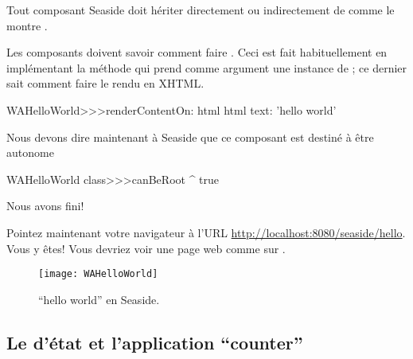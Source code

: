 \documentclass[a4paper,10pt,twoside]{book}
\begin{document}
Tout composant Seaside doit hériter directement ou indirectement de
 comme le montre .


Les composants doivent savoir comment faire .
Ceci est fait habituellement en implémentant la méthode
 qui prend comme argument une
instance de  ; ce dernier sait comment faire le
rendu en XHTML.

\begin{code}{}
WAHelloWorld>>>renderContentOn: html
	html text: 'hello world'
\end{code}

\noindent
Nous devons dire maintenant à Seaside que ce composant est destiné à
être autonome


\begin{code}{}
WAHelloWorld class>>>canBeRoot
	^ true
\end{code}

\noindent
Nous avons fini!

Pointez maintenant votre navigateur 
à l'URL \url{http://localhost:8080/seaside/hello}.
Vous y êtes! Vous devriez voir une page web comme sur
 .

\begin{figure}[htb]
\begin{center}
\texttt{[image: WAHelloWorld]}
\caption{``hello world'' en Seaside.}
\end{center}
\end{figure}

\subsection{Le \backtracking d'état et l'application ``counter''}
\end{document}
